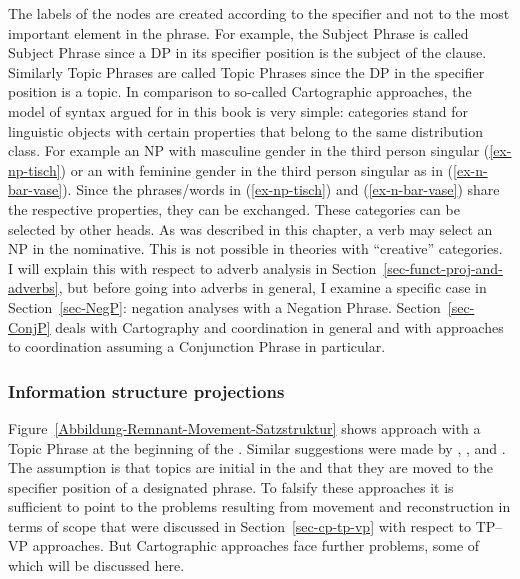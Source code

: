 The labels of the nodes are created according to the specifier and not to the most important element
in the phrase. For example, the Subject Phrase is called Subject Phrase since a DP in its specifier
position is the subject of the clause. Similarly Topic Phrases are called Topic Phrases since the DP
in the specifier position is a topic. 
In comparison to so-called Cartographic approaches, the model of syntax argued for in this book is very simple: categories stand for linguistic objects
with certain properties that belong to the same distribution class. For example an NP with masculine
gender in the third person singular (\ref{ex-np-tisch}) or an \nbar with feminine gender in the third person
singular as in (\ref{ex-n-bar-vase}). Since the phrases/words in (\ref{ex-np-tisch}) and
(\ref{ex-n-bar-vase}) share the respective properties, they can be exchanged. These categories can be
selected by other heads. As was described in this chapter, a verb may select an NP in the
nominative. This is not possible in theories with ``creative'' categories. I will explain this with
respect to  adverb analysis in Section~\ref{sec-funct-proj-and-adverbs}, but
before going into adverbs in general, I examine a specific case in Section~\ref{sec-NegP}: negation
analyses with a Negation Phrase. Section~\ref{sec-ConjP} deals with Cartography and coordination in
general and with approaches to coordination assuming a Conjunction Phrase in particular.



\subsubsection{Information structure projections}

Figure~\ref{Abbildung-Remnant-Movement-Satzstruktur} shows  approach with a Topic Phrase at the
beginning of the \mf. Similar suggestions were made by \citet[, 495]{MS93a-u}, \citet{Haftka95a}, \citet{Frey2004b-u} and
\citet[]{Grewendorf2005a-u}. The assumption is that topics
are initial in the \mf and that they are moved to the specifier position of a designated phrase. To
falsify these approaches it is sufficient to point to the problems resulting from movement and
reconstruction in terms of scope that were discussed in Section~\ref{sec-cp-tp-vp} with respect to TP–VP
approaches. But Cartographic approaches face further problems, some of which will be
discussed here.

